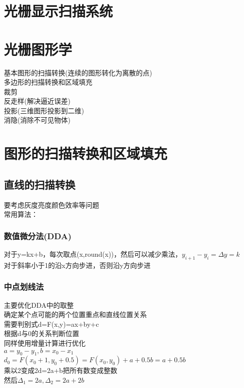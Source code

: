 \documentclass{article}
\begin{document}
\begin{CJK}{UTF8}{gbsn}
\section{光栅显示扫描系统}



\section{光栅图形学}
	基本图形的扫描转换(连续的图形转化为离散的点)\\
	多边形的扫描转换和区域填充\\
	裁剪\\
	反走样(解决逼近误差)\\
	投影(三维图形投影到二维)\\
	消隐(消除不可见物体)\\
\section{图形的扫描转换和区域填充}
	\subsection{直线的扫描转换}
	要考虑灰度亮度颜色效率等问题\\
	常用算法：\\
	\subsubsection{数值微分法(DDA)}
	对于y=kx+b，每次取点(x,round(x))，然后可以减少乘法，$y_{i+1}-y_i=\Delta y=k$\\
	对于斜率小于1的沿x方向步进，否则沿y方向步进\\
	\subsubsection{中点划线法}	
	主要优化DDA中的取整\\
	确定某个点可能的两个位置重点和直线位置关系\\
	需要判别式d=F(x,y)=ax+by+c\\
	根据d与0的关系判断位置\\
	同样使用增量计算进行优化\\
	$a=y_0-y_1,b=x_0-x_1$\\
	$d_0=F(x_0+1,y_0+0.5)=F(x_0,y_0)+a+0.5b=a+0.5b$\\
	乘以2变成2d=2a+b把所有数变成整数\\
	然后$\Delta_1=2a,\Delta_2=2a+2b$\\

\end{CJK}
\end{document}
